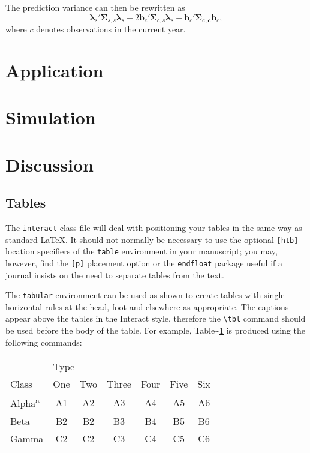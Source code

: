\documentclass[]{interact}
\theoremstyle{plain}%
\theoremstyle{definition}
\theoremstyle{remark}
\begin{document}
The prediction variance can then be rewritten as \mbox{}
\begin{equation}
\bm{\lambda}_s'\bm{\Sigma}_{s, s}\bm{\lambda}_s - 2 \mathbf{b}_{c}' \bm{\Sigma}_{c, s} \bm{\lambda}_s + \mathbf{b}_{c}' \bm{\Sigma_{c, c}} \mathbf{b}_{c},
\end{equation} \noindent where \(c\) denotes observations in the current
year.

\section{Application}

\section{Simulation}

\section{Discussion}

\hypertarget{tables}{%
\subsection{Tables}\label{tables}}

The \texttt{interact} class file will deal with positioning your tables
in the same way as standard \LaTeX. It should not normally be necessary
to use the optional \texttt{{[}htb{]}} location specifiers of the
\texttt{table} environment in your manuscript; you may, however, find
the \texttt{{[}p{]}} placement option or the \texttt{endfloat} package
useful if a journal insists on the need to separate tables from the
text.

The \texttt{tabular} environment can be used as shown to create tables
with single horizontal rules at the head, foot and elsewhere as
appropriate. The captions appear above the tables in the
\textsf{Interact} style, therefore the \texttt{\textbackslash{}tbl}
command should be used before the body of the table. For example,
Table\textasciitilde{}\ref{sample-table} is produced using the following
commands:

\begin{table}
{\begin{tabular}{lcccccc} \toprule
 & \multicolumn{2}{l}{Type} \\ \cmidrule{2-7}
 Class & One & Two & Three & Four & Five & Six \\ \midrule
 Alpha\textsuperscript{a} & A1 & A2 & A3 & A4 & A5 & A6 \\
 Beta & B2 & B2 & B3 & B4 & B5 & B6 \\
 Gamma & C2 & C2 & C3 & C4 & C5 & C6 \\ \bottomrule
\end{tabular}}
\label{sample-table}
\end{table}
\end{document}
